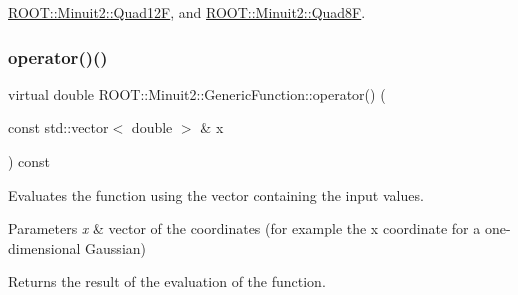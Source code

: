 \mbox{\hyperlink{classROOT_1_1Minuit2_1_1Quad12F_ad68fa5e48b2de950139a1e73a5a0558b}{R\+O\+O\+T\+::\+Minuit2\+::\+Quad12F}}, and \mbox{\hyperlink{classROOT_1_1Minuit2_1_1Quad8F_ade3e6d285a6c3733f9032d6e5c0c0a9b}{R\+O\+O\+T\+::\+Minuit2\+::\+Quad8F}}.

\mbox{\label{classROOT_1_1Minuit2_1_1GenericFunction_a0d6039ad9aa18e475534d1fd80342e9d}} 
\subsubsection{\texorpdfstring{operator()()}{operator()()}\hspace{0.1cm}{\footnotesize\ttfamily [2/2]}}
{\footnotesize\ttfamily virtual double R\+O\+O\+T\+::\+Minuit2\+::\+Generic\+Function\+::operator() (\begin{DoxyParamCaption}\item[{const std\+::vector$<$ double $>$ \&}]{x }\end{DoxyParamCaption}) const\hspace{0.3cm}{\ttfamily [pure virtual]}}

Evaluates the function using the vector containing the input values.


\begin{DoxyParams}{Parameters}
{\em x} & vector of the coordinates (for example the x coordinate for a one-\/dimensional Gaussian)\\
\hline
\end{DoxyParams}
\begin{DoxyReturn}{Returns}
the result of the evaluation of the function. 
\end{DoxyReturn}



